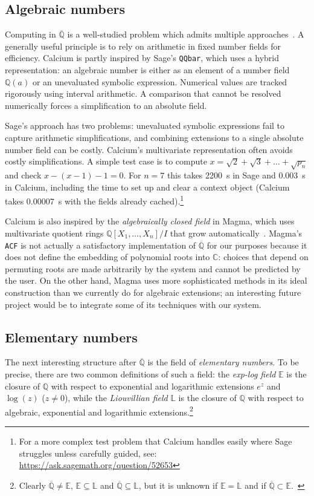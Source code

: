 \documentclass[sigconf,screen,urlbreakonhyphens]{acmart}
\begin{document}
\subsection{Algebraic numbers}

Computing in $\overline{\mathbb{Q}}$ is a well-studied problem
which admits multiple approaches~\cite{Coh1996}.
A generally useful principle is to rely on arithmetic
in fixed number fields for efficiency.
Calcium is partly inspired by
Sage's \texttt{QQbar}, which uses a hybrid representation:
an algebraic number is either as an
element of a number field $\mathbb{Q}(a)$ or
an unevaluated symbolic expression.
Numerical values are tracked rigorously using interval arithmetic.
A comparison that cannot be resolved numerically
forces a simplification to an absolute field.

Sage's approach has two problems: unevaluated symbolic
expressions fail to capture arithmetic simplifications,
and combining extensions to a single
absolute number field can be costly.
Calcium's multivariate representation often avoids
costly simplifications.
A simple test case is to compute $x = \sqrt{2} + \sqrt{3} + \ldots + \sqrt{p_n}$
and check $x-(x-1)-1 = 0$.
For $n = 7$ this takes 2200~s in Sage and 0.003~s in Calcium, including the
time to set up and clear a context object (Calcium takes 0.00007~s with the fields already cached).\footnote{For a more complex test problem that Calcium handles easily
where Sage struggles unless carefully guided, see: \url{https://ask.sagemath.org/question/52653}}

Calcium is also inspired by the \emph{algebraically closed field}
in Magma,
which uses multivariate quotient rings
$\mathbb{Q}[X_1,\ldots,X_n] / I$
that grow automatically~\cite{Ste2002,Ste2010}.
Magma's \texttt{ACF} is not actually a satisfactory implementation of $\overline{\mathbb{Q}}$
for our purposes
because it does not define the embedding of polynomial roots into $\mathbb{C}$:
choices that depend on permuting roots are made arbitrarily by the system
and cannot be predicted by the user.
On the other hand, Magma uses more sophisticated methods
in its ideal construction than we currently do for algebraic extensions; an interesting
future project would be to integrate some of its techniques with our system.

\subsection{Elementary numbers}

The next interesting structure after $\overline{\mathbb{Q}}$
is the field of \emph{elementary numbers}.
To be precise, there are two common definitions of such a field:
the \emph{exp-log field} $\mathbb{E}$ is the closure of $\mathbb{Q}$
with respect to exponential and logarithmic extensions $e^z$ and $\log(z)$ ($z \ne 0$),
while the \emph{Liouvillian field} $\mathbb{L}$ is
the closure of $\mathbb{Q}$ with respect to algebraic,
exponential and logarithmic extensions.\footnote{Clearly $\overline{\mathbb{Q}} \ne \mathbb{E}$, $\mathbb{E} \subseteq \mathbb{L}$ and $\overline{\mathbb{Q}} \subseteq \mathbb{L}$,
but it is unknown if $\mathbb{E} = \mathbb{L}$ and if $\overline{\mathbb{Q}} \subset \mathbb{E}$.~\cite{Cho1999}}
\end{document}
